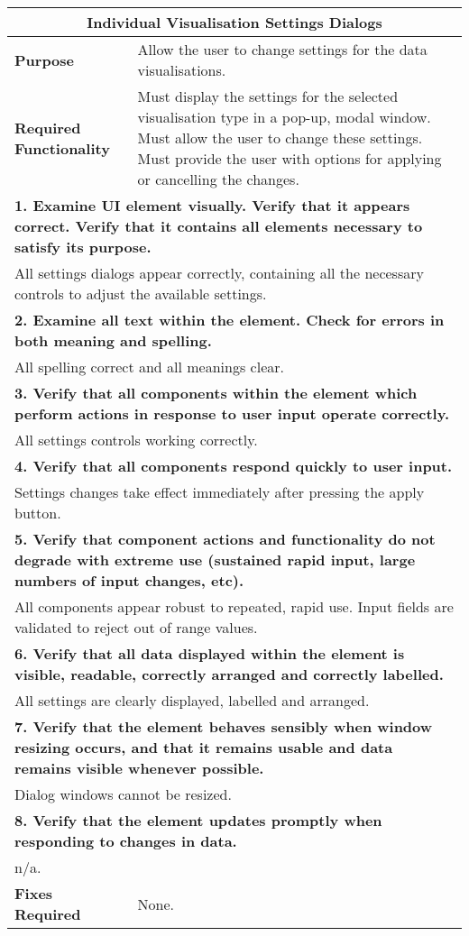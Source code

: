 \begin{longtable}{ l p{10cm} }
 \hline
 \multicolumn{2}{c}{\textbf{Individual Visualisation Settings Dialogs}}\\
 \hline
 \textbf{Purpose} & Allow the user to change settings for the data visualisations.\\
 \textbf{Required Functionality} & Must display the settings for the selected visualisation type in a pop-up, modal window. Must allow the user to change these settings. Must provide the user with options for applying or cancelling the changes.\\
 \hline
 \multicolumn{2}{p{14cm}}{\textbf{1. Examine UI element visually. Verify that it appears correct. Verify that it contains all elements necessary to satisfy its purpose.}}\\
 \multicolumn{2}{p{14cm}}{All settings dialogs appear correctly, containing all the necessary controls to adjust the available settings.}\\
 \hline
 \multicolumn{2}{p{14cm}}{\textbf{2. Examine all text within the element. Check for errors in both meaning and spelling.}}\\
 \multicolumn{2}{p{14cm}}{All spelling correct and all meanings clear.}\\
 \hline
 \multicolumn{2}{p{14cm}}{\textbf{3. Verify that all components within the element which perform actions in response to user input operate correctly.}}\\
 \multicolumn{2}{p{14cm}}{All settings controls working correctly.}\\
 \hline
 \multicolumn{2}{p{14cm}}{\textbf{4. Verify that all components respond quickly to user input.}}\\
 \multicolumn{2}{p{14cm}}{Settings changes take effect immediately after pressing the apply button.}\\
 \hline
 \multicolumn{2}{p{14cm}}{\textbf{5. Verify that component actions and functionality do not degrade with extreme use (sustained rapid input, large numbers of input changes, etc).}}\\
 \multicolumn{2}{p{14cm}}{All components appear robust to repeated, rapid use. Input fields are validated to reject out of range values.}\\
 \hline
 \multicolumn{2}{p{14cm}}{\textbf{6. Verify that all data displayed within the element is visible, readable, correctly arranged and correctly labelled.}}\\
 \multicolumn{2}{p{14cm}}{All settings are clearly displayed, labelled and arranged.}\\
 \hline
 \multicolumn{2}{p{14cm}}{\textbf{7. Verify that the element behaves sensibly when window resizing occurs, and that it remains usable and data remains visible whenever possible.}}\\
 \multicolumn{2}{p{14cm}}{Dialog windows cannot be resized.}\\
 \hline
 \multicolumn{2}{p{14cm}}{\textbf{8. Verify that the element updates promptly when responding to changes in data.}}\\
 \multicolumn{2}{p{14cm}}{n/a.}\\
 \hline
 \textbf{Fixes Required} & None.\\
 \bottomrule
\end{longtable}
